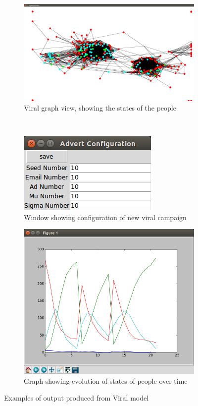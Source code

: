 \documentclass[12pt,a4paper]{article}
\begin{document}
\begin{figure}[htb]
\centering
\captionsetup[subfigure]{justification=centering}
	\begin{subfigure}[c]{0.9\linewidth}
	\centering
	\caption{Viral graph view, showing the states of the people}
	\label{fig:viralStates}
	\includegraphics[scale=0.1]{Viral1.png}
	\end{subfigure}
\\
	\begin{subfigure}[c]{0.4\linewidth}
	\centering
	\caption{Window showing configuration of new viral campaign}
	\label{fig:viralConfig}
	\includegraphics[scale=0.3]{Viral2.png}
	\end{subfigure}
\quad
	\begin{subfigure}[c]{0.4\linewidth}
	\centering
	\caption{Graph showing evolution of states of people over time}
	\label{fig:viralGraph}
	\includegraphics[scale=0.2]{Viral3.png}
	\end{subfigure}
\caption{Examples of output produced from Viral model}
\label{fig:viral}
\end{figure}
\end{document}
